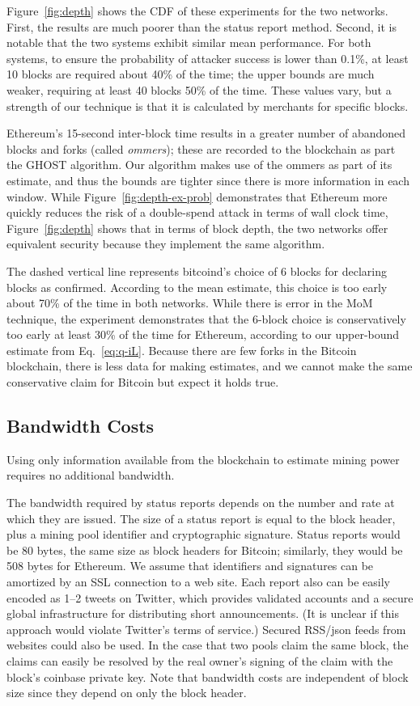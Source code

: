 \documentclass[10pt,sigconf]{acmart}
\newcommand{\1}{{\em (i)}}
\newcommand{\2}{{\em (ii)}}
\newcommand{\3}{{\em (iii)}}
\newcommand{\4}{{\em (iv)}}
\newcommand{\5}{{\em (v)}}
\begin{document}
Figure~\ref{fig:depth} shows the CDF of these experiments for the two networks. First, the results are much poorer than the status report method. Second, it is notable that the two systems exhibit similar mean performance.  For both  systems, to ensure the probability of attacker success is lower than 0.1\%, at least 10 blocks are required about 40\% of the time; the upper bounds are much weaker, requiring at least 40 blocks 50\% of the time. These values vary, but a strength of our technique is that it is
calculated by merchants for specific blocks.
   
Ethereum's 15-second inter-block time results in a greater number of abandoned blocks and forks (called {\em ommers}); these are recorded to the blockchain as part the GHOST algorithm. Our algorithm makes use of the ommers as part of its estimate, and thus the bounds are tighter since there is more information in each window. While Figure~\ref{fig:depth-ex-prob} demonstrates that Ethereum more quickly reduces the risk of a double-spend attack in terms of wall clock time, Figure~\ref{fig:depth} shows that in terms of block depth, the two networks offer equivalent security because they implement the same algorithm.

The dashed vertical line represents bitcoind's choice of 6 blocks for declaring blocks as confirmed. According to the mean  estimate, this choice is too early about 70\% of the time in both networks. While there  is error in the MoM technique, the experiment demonstrates that the 6-block choice is conservatively too early at least 30\% of the time for Ethereum, according to our upper-bound estimate from Eq.~\ref{eq:q-iL}. Because there are few forks in the Bitcoin blockchain, there is less data for making estimates, and we cannot make the same conservative claim for Bitcoin but expect it holds true.



\subsection{Bandwidth Costs}\label{sec:bandwidth}
Using only information available from the blockchain to estimate mining power requires no additional bandwidth.

The bandwidth required by status reports depends on the number and
rate at which they are issued. The size of a status report is equal to
the block header, plus a mining pool identifier and cryptographic
signature.  Status reports would be 80 bytes, the same size as
block headers for Bitcoin; similarly, they would be 508
bytes for Ethereum. We assume that identifiers and signatures can be amortized by
an SSL connection to a web site.  Each report also can be easily encoded as
1--2 tweets on Twitter, which provides validated accounts and a secure
global infrastructure for distributing short announcements. (It is unclear if this approach would violate Twitter's terms of service.) Secured
RSS/json feeds from websites could also be used. In the case that two pools claim the same block, the claims can easily be resolved by the real owner's
signing of the claim with the block's coinbase private key. Note that bandwidth costs are independent of block size   since they depend on only the block header.
\end{document}
